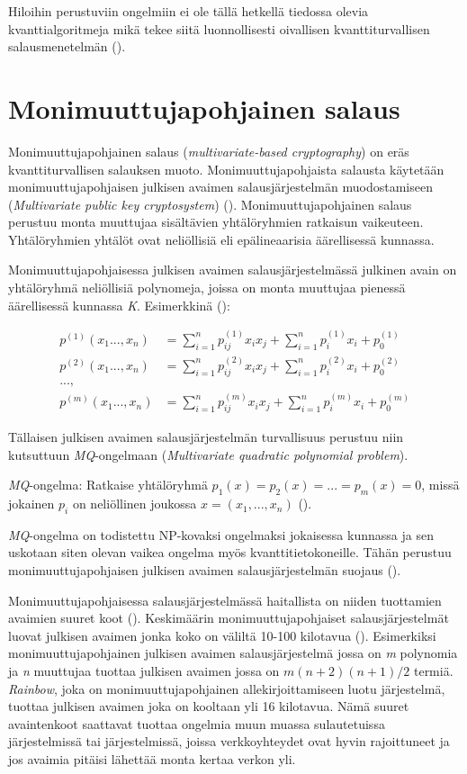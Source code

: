 Hiloihin perustuviin ongelmiin ei ole tällä hetkellä tiedossa olevia kvanttialgoritmeja mikä tekee siitä luonnollisesti oivallisen kvanttiturvallisen salausmenetelmän (\cite{regev2006lattice}).

\section{Monimuuttujapohjainen salaus}
Monimuuttujapohjainen salaus (\emph{multivariate-based cryptography}) on eräs kvanttiturvallisen salauksen muoto. Monimuuttujapohjaista salausta käytetään monimuuttujapohjaisen julkisen avaimen salausjärjestelmän muodostamiseen (\emph{Multivariate public key cryptosystem}) (\cite{Ding2009}). Monimuuttujapohjainen salaus perustuu monta muuttujaa sisältävien yhtälöryhmien ratkaisun vaikeuteen. Yhtälöryhmien yhtälöt ovat neliöllisiä eli epälineaarisia äärellisessä kunnassa.

Monimuuttujapohjaisessa julkisen avaimen salausjärjestelmässä julkinen avain on yhtälöryhmä neliöllisiä polynomeja, joissa on monta muuttujaa pienessä äärellisessä kunnassa \emph{K}. Esimerkkinä (\cite{8012305}): 

    \begin{align*}
        p^{(1)}(x_{1}...,x_{n}) &= \sum_{i=1}^{n} p_{ij}^{(1)}x_{i}x_ {j}+\sum_{i=1}^{n}p_ {i}^{(1)}x_{i}+p_ {0}^{(1)} \\
        p^{(2)}(x_{1}...,x_{n}) &= \sum_{i=1}^{n} p_{ij}^{(2)}x_{i}x_ {j}+\sum_{i=1}^{n}p_ {i}^{(2)}x_{i}+p_ {0}^{(2)} \\
        ..., \\
        p^{(m)}(x_{1}...,x_{n}) &= \sum_{i=1}^{n} p_{ij}^{(m)}x_{i}x_ {j}+\sum_{i=1}^{n}p_ {i}^{(m)}x_{i}+p_ {0}^{(m)}
    \end{align*}
    
Tällaisen julkisen avaimen salausjärjestelmän turvallisuus perustuu niin kutsuttuun \emph{MQ}-ongelmaan (\emph{Multivariate quadratic polynomial problem}).

\emph{MQ}-ongelma: Ratkaise yhtälöryhmä $p_{1}(x) = p_{2}(x) = ... = p_ {m}(x) = 0$, missä jokainen $p_{i}$ on neliöllinen joukossa $x = (x_{1}, ..., x_{n})$ (\cite{Ding2009}).

\emph{MQ}-ongelma on todistettu NP-kovaksi ongelmaksi jokaisessa kunnassa ja sen uskotaan siten olevan vaikea ongelma myös kvanttitietokoneille. Tähän perustuu monimuuttujapohjaisen julkisen avaimen salausjärjestelmän suojaus (\cite{8012305}).

Monimuuttujapohjaisessa salausjärjestelmässä haitallista on niiden tuottamien avaimien suuret koot (\cite{Ding2009}). Keskimäärin monimuuttujapohjaiset salausjärjestelmät luovat julkisen avaimen jonka koko on väliltä 10-100 kilotavua (\cite{8012305}). Esimerkiksi monimuuttujapohjainen julkisen avaimen salausjärjestelmä jossa on \emph{m} polynomia ja \emph{n} muuttujaa tuottaa julkisen avaimen jossa on $m(n+2)(n+1)/2$ termiä. \emph{Rainbow}, joka on monimuuttujapohjainen allekirjoittamiseen luotu järjestelmä, tuottaa julkisen avaimen joka on kooltaan yli 16 kilotavua. Nämä suuret avaintenkoot saattavat tuottaa ongelmia muun muassa sulautetuissa järjestelmissä tai järjestelmissä, joissa verkkoyhteydet ovat hyvin rajoittuneet ja jos avaimia pitäisi lähettää monta kertaa verkon yli.

